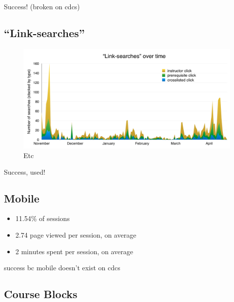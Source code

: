 Success! (broken on cdcs)

\subsection{``Link-searches''}

\begin{figure}
  \centering
  \includegraphics[width=1.0\textwidth]{images/graph/linksearches}

  \caption{Etc}
  \label{fig:searchtypes}
\end{figure}

Success, used!

\subsection{Mobile}

\begin{itemize}
  \item 11.54\% of sessions
  \item 2.74 page viewed per session, on average
  \item 2 minutes spent per session, on average
\end{itemize}

success bc mobile doesn't exist on cdcs

\subsection{Course Blocks}

